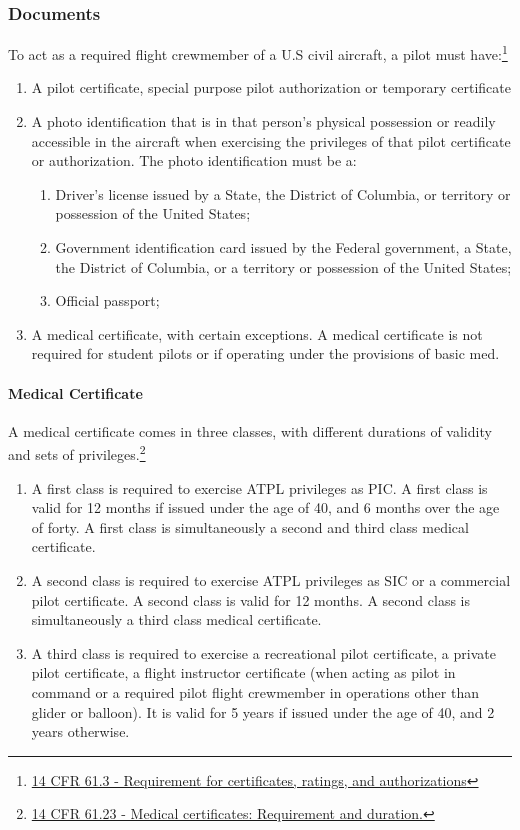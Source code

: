 \documentclass[12pt]{article}
\begin{document}
		\subsubsection{Documents}
			To act as a required flight crewmember of a U.S civil aircraft, a pilot must have:\footnote{\href{https://www.law.cornell.edu/cfr/text/14/61.3}{14 CFR 61.3 - Requirement for certificates, ratings, and authorizations}}
				\begin{enumerate}
					\item A pilot certificate, special purpose pilot authorization or temporary certificate
					\item A photo identification that is in that person's physical possession or readily accessible in the aircraft when exercising the privileges of that pilot certificate or authorization. The photo identification must be a:
						\begin{enumerate}
							\item Driver's license issued by a State, the District of Columbia, or territory or possession of the United States;
							\item Government identification card issued by the Federal government, a State, the District of Columbia, or a territory or possession of the United States;
							\item Official passport;
						\end{enumerate}
					\item A medical certificate, with certain exceptions. A medical certificate is not required for student pilots or if operating under the provisions of basic med.
				\end{enumerate}
			\paragraph{Medical Certificate}
				A medical certificate comes in three classes, with different durations of validity and sets of privileges.\footnote{\href{https://www.law.cornell.edu/cfr/text/14/61.23}{14 CFR 61.23 - Medical certificates: Requirement and duration.}}
				\begin{enumerate}
					\item A first class is required to exercise ATPL privileges as PIC. A first class is valid for 12 months if issued under the age of 40, and 6 months over the age of forty. A first class is simultaneously a second and third class medical certificate.
					\item A second class is required to exercise ATPL privileges as SIC or a commercial pilot certificate. A second class is valid for 12 months. A second class is simultaneously a third class medical certificate.
					\item A third class is required to exercise a recreational pilot certificate, a private pilot certificate, a flight instructor certificate (when acting as pilot in command or a required pilot flight crewmember in operations other than glider or balloon). It is valid for 5 years if issued under the age of 40, and 2 years otherwise.
				\end{enumerate}
\end{document}

